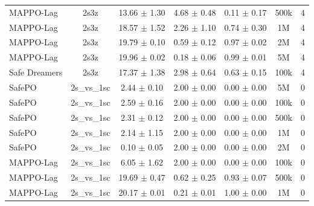 \documentclass{article}
\begin{document}
\begin{longtable}{lcccccc}
MAPPO-Lag & 2s3z & \textcolor{green!60!black}{13.66 $\pm$ 1.30} & \textcolor{green!60!black}{4.68 $\pm$ 0.48} & \textcolor{green!60!black}{0.11 $\pm$ 0.17} & 500k & 4 \\
MAPPO-Lag & 2s3z & \textcolor{red!70!black}{18.57 $\pm$ 1.52} & \textcolor{red!70!black}{2.26 $\pm$ 1.10} & \textcolor{red!70!black}{0.74 $\pm$ 0.30} & 1M & 4 \\
MAPPO-Lag & 2s3z & \textcolor{red!70!black}{19.79 $\pm$ 0.10} & \textcolor{red!70!black}{0.59 $\pm$ 0.12} & \textcolor{red!70!black}{0.97 $\pm$ 0.02} & 2M & 4 \\
MAPPO-Lag & 2s3z & \textcolor{red!70!black}{19.96 $\pm$ 0.02} & \textcolor{red!70!black}{0.18 $\pm$ 0.06} & \textcolor{red!70!black}{0.99 $\pm$ 0.01} & 5M & 4 \\
Safe Dreamers & 2s3z & 17.37 $\pm$ 1.38 & 2.98 $\pm$ 0.64 & 0.63 $\pm$ 0.15 & 100k & 4 \\
\midrule
SafePO & 2s\_vs\_1sc & \textcolor{green!60!black}{2.44 $\pm$ 0.10} & \textcolor{green!60!black}{2.00 $\pm$ 0.00} & \textcolor{green!60!black}{0.00 $\pm$ 0.00} & 5M & 0 \\
SafePO & 2s\_vs\_1sc & \textcolor{green!60!black}{2.59 $\pm$ 0.16} & \textcolor{green!60!black}{2.00 $\pm$ 0.00} & \textcolor{green!60!black}{0.00 $\pm$ 0.00} & 100k & 0 \\
SafePO & 2s\_vs\_1sc & \textcolor{green!60!black}{2.31 $\pm$ 0.12} & \textcolor{green!60!black}{2.00 $\pm$ 0.00} & \textcolor{green!60!black}{0.00 $\pm$ 0.00} & 500k & 0 \\
SafePO & 2s\_vs\_1sc & \textcolor{green!60!black}{2.14 $\pm$ 1.15} & \textcolor{green!60!black}{2.00 $\pm$ 0.00} & \textcolor{green!60!black}{0.00 $\pm$ 0.00} & 1M & 0 \\
SafePO & 2s\_vs\_1sc & \textcolor{green!60!black}{0.10 $\pm$ 0.05} & \textcolor{green!60!black}{2.00 $\pm$ 0.00} & \textcolor{green!60!black}{0.00 $\pm$ 0.00} & 2M & 0 \\
MAPPO-Lag & 2s\_vs\_1sc & \textcolor{green!60!black}{6.05 $\pm$ 1.62} & \textcolor{green!60!black}{2.00 $\pm$ 0.00} & \textcolor{green!60!black}{0.00 $\pm$ 0.00} & 100k & 0 \\
MAPPO-Lag & 2s\_vs\_1sc & \textcolor{green!60!black}{19.69 $\pm$ 0.47} & \textcolor{green!60!black}{0.62 $\pm$ 0.25} & \textcolor{green!60!black}{0.93 $\pm$ 0.07} & 500k & 0 \\
MAPPO-Lag & 2s\_vs\_1sc & \textcolor{red!70!black}{20.17 $\pm$ 0.01} & \textcolor{red!70!black}{0.21 $\pm$ 0.01} & \textcolor{red!70!black}{1.00 $\pm$ 0.00} & 1M & 0 \\

\end{longtable}
\end{document}
